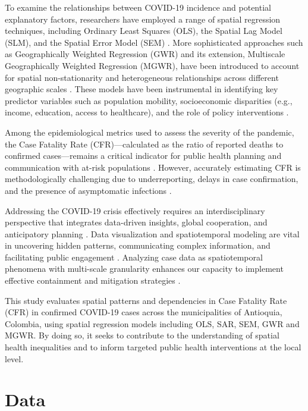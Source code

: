\documentclass[a4paper,fleqn]{cas-sc}
\begin{document}
To examine the relationships between COVID-19 incidence and potential explanatory factors, researchers have employed a range of spatial regression techniques, including Ordinary Least Squares (OLS), the Spatial Lag Model (SLM), and the Spatial Error Model (SEM) \citep{Yu2021,Dutta2021,Aristizabal2024}. More sophisticated approaches such as Geographically Weighted Regression (GWR) and its extension, Multiscale Geographically Weighted Regression (MGWR), have been introduced to account for spatial non-stationarity and heterogeneous relationships across different geographic scales \citep{Han2021,Chen2021,Yu2021,Aristizabal2024}. These models have been instrumental in identifying key predictor variables such as population mobility, socioeconomic disparities (e.g., income, education, access to healthcare), and the role of policy interventions \citep{Ramrez-Aldana2021}.

Among the epidemiological metrics used to assess the severity of the pandemic, the Case Fatality Rate (CFR)—calculated as the ratio of reported deaths to confirmed cases—remains a critical indicator for public health planning and communication with at-risk populations \citep{Das2022,Chaparro2021}. However, accurately estimating CFR is methodologically challenging due to underreporting, delays in case confirmation, and the presence of asymptomatic infections \citep{Paternina-Caicedo2022}.

Addressing the COVID-19 crisis effectively requires an interdisciplinary perspective that integrates data-driven insights, global cooperation, and anticipatory planning \citep{Franch-Pardo2020}. Data visualization and spatiotemporal modeling are vital in uncovering hidden patterns, communicating complex information, and facilitating public engagement \citep{Turbe2020}. Analyzing case data as spatiotemporal phenomena with multi-scale granularity enhances our capacity to implement effective containment and mitigation strategies \citep{AdelaideYeboahForkuo2025,Roy2021,Lin2024}.

This study evaluates spatial patterns and dependencies in Case Fatality Rate (CFR) in confirmed COVID-19 cases across the municipalities of Antioquia, Colombia, using spatial regression models including OLS, SAR, SEM, GWR and MGWR. By doing so, it seeks to contribute to the understanding of spatial health inequalities and to inform targeted public health interventions at the local level.


\section{Data}
\end{document}
